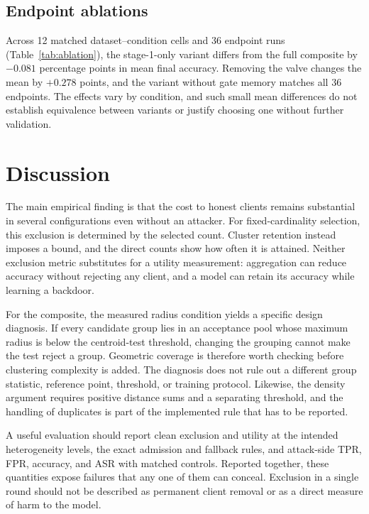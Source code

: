 \documentclass[journal]{IEEEtran}
\begin{document}
\subsection{Endpoint ablations}

Across 12 matched dataset--condition cells and 36 endpoint runs (Table~\ref{tab:ablation}), the stage-1-only variant differs from the full composite by $-0.081$ percentage points in mean final accuracy. Removing the valve changes the mean by $+0.278$ points, and the variant without gate memory matches all 36 endpoints. The effects vary by condition, and such small mean differences do not establish equivalence between variants or justify choosing one without further validation.

\section{Discussion}\label{sec:discussion}
The main empirical finding is that the cost to honest clients remains substantial in several configurations even without an attacker. For fixed-cardinality selection, this exclusion is determined by the selected count. Cluster retention instead imposes a bound, and the direct counts show how often it is attained. Neither exclusion metric substitutes for a utility measurement: aggregation can reduce accuracy without rejecting any client, and a model can retain its accuracy while learning a backdoor.

For the composite, the measured radius condition yields a specific design diagnosis. If every candidate group lies in an acceptance pool whose maximum radius is below the centroid-test threshold, changing the grouping cannot make the test reject a group. Geometric coverage is therefore worth checking before clustering complexity is added. The diagnosis does not rule out a different group statistic, reference point, threshold, or training protocol. Likewise, the density argument requires positive distance sums and a separating threshold, and the handling of duplicates is part of the implemented rule that has to be reported.

A useful evaluation should report clean exclusion and utility at the intended heterogeneity levels, the exact admission and fallback rules, and attack-side TPR, FPR, accuracy, and ASR with matched controls. Reported together, these quantities expose failures that any one of them can conceal. Exclusion in a single round should not be described as permanent client removal or as a direct measure of harm to the model.
\end{document}
